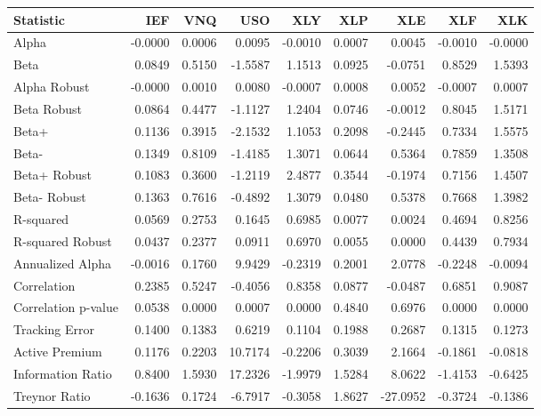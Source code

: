 \begin{tabular}{lrrrrrrrr}
\toprule
Statistic & IEF & VNQ & USO & XLY & XLP & XLE & XLF & XLK \\
\midrule
Alpha & -0.0000 & 0.0006 & 0.0095 & -0.0010 & 0.0007 & 0.0045 & -0.0010 & -0.0000 \\
Beta & 0.0849 & 0.5150 & -1.5587 & 1.1513 & 0.0925 & -0.0751 & 0.8529 & 1.5393 \\
Alpha Robust & -0.0000 & 0.0010 & 0.0080 & -0.0007 & 0.0008 & 0.0052 & -0.0007 & 0.0007 \\
Beta Robust & 0.0864 & 0.4477 & -1.1127 & 1.2404 & 0.0746 & -0.0012 & 0.8045 & 1.5171 \\
Beta+ & 0.1136 & 0.3915 & -2.1532 & 1.1053 & 0.2098 & -0.2445 & 0.7334 & 1.5575 \\
Beta- & 0.1349 & 0.8109 & -1.4185 & 1.3071 & 0.0644 & 0.5364 & 0.7859 & 1.3508 \\
Beta+ Robust & 0.1083 & 0.3600 & -1.2119 & 2.4877 & 0.3544 & -0.1974 & 0.7156 & 1.4507 \\
Beta- Robust & 0.1363 & 0.7616 & -0.4892 & 1.3079 & 0.0480 & 0.5378 & 0.7668 & 1.3982 \\
R-squared & 0.0569 & 0.2753 & 0.1645 & 0.6985 & 0.0077 & 0.0024 & 0.4694 & 0.8256 \\
R-squared Robust & 0.0437 & 0.2377 & 0.0911 & 0.6970 & 0.0055 & 0.0000 & 0.4439 & 0.7934 \\
Annualized Alpha & -0.0016 & 0.1760 & 9.9429 & -0.2319 & 0.2001 & 2.0778 & -0.2248 & -0.0094 \\
Correlation & 0.2385 & 0.5247 & -0.4056 & 0.8358 & 0.0877 & -0.0487 & 0.6851 & 0.9087 \\
Correlation p-value & 0.0538 & 0.0000 & 0.0007 & 0.0000 & 0.4840 & 0.6976 & 0.0000 & 0.0000 \\
Tracking Error & 0.1400 & 0.1383 & 0.6219 & 0.1104 & 0.1988 & 0.2687 & 0.1315 & 0.1273 \\
Active Premium & 0.1176 & 0.2203 & 10.7174 & -0.2206 & 0.3039 & 2.1664 & -0.1861 & -0.0818 \\
Information Ratio & 0.8400 & 1.5930 & 17.2326 & -1.9979 & 1.5284 & 8.0622 & -1.4153 & -0.6425 \\
Treynor Ratio & -0.1636 & 0.1724 & -6.7917 & -0.3058 & 1.8627 & -27.0952 & -0.3724 & -0.1386 \\
\bottomrule
\end{tabular}
